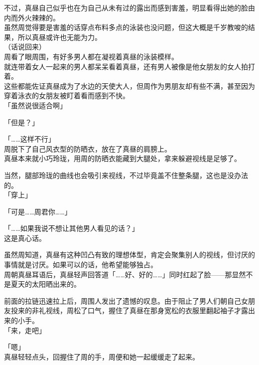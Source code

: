 不过，真昼自己似乎也在为自己从未有过的露出而感到害羞，明显看得出她的脸由内而外火辣辣的。\\

虽然周觉得要是害羞的话穿点布料多点的泳装也没问题，但这大概是千岁教唆的结果，所以真昼或许也无能为力。\\

（话说回来）\\

周看了眼周围，有好多男人都在凝视着真昼的泳装模样。\\

就连带着女人一起来的男人都呆呆看着真昼，还有男人被像是他女朋友的女人拍打着。\\

这些都能佐证真昼成为了水边的天使大人，但周作为男朋友却有些不满，甚至因为穿着泳衣的女朋友被盯着看而感到不快。\\

「虽然说很适合啊」

「但是？」

「……这样不行」\\

周脱下了自己风衣型的防晒衣，放在了真昼的肩膀上。\\

真昼本来就小巧玲珑，用周的防晒衣能藏到大腿处，拿来躲避视线是足够了。

当然，腿部玲珑的曲线也会吸引来视线，不过毕竟盖不住整条腿，这也是没办法的。\\

「穿上」

「可是……周君你……」

「……如果我说不想让其他男人看见的话？」\\

这是真心话。

虽然周知道，真昼有这种凹凸有致的理想体型，肯定会聚集别人的视线，但讨厌的事情就是讨厌。如果可以的话，他希望能够独占。\\

周朝真昼耳语后，真昼轻声回答道「……好、好的……」同时红起了脸——那显然不是夏天的太阳晒出来的。

前面的拉链迅速拉上后，周围人发出了遗憾的叹息。由于阻止了男人们朝自己女朋友投来的非礼视线，周松了口气，握住了真昼在那身宽松的衣服里翻起袖子才露出来的小手。\\

「来，走吧」

「嗯」\\

真昼轻轻点头，回握住了周的手，周便和她一起缓缓走了起来。

